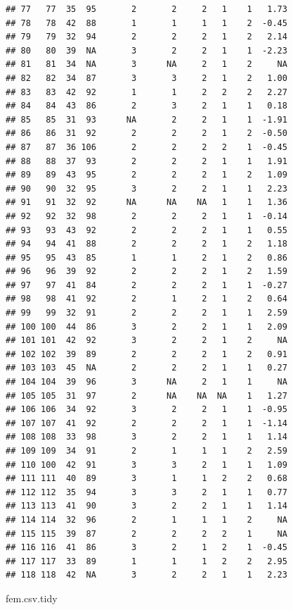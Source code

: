\documentclass[
]{book}
\newenvironment{Shaded}{\begin{snugshade}}{\end{snugshade}}
\newcommand{\NormalTok}[1]{#1}
\begin{document}
\begin{verbatim}
## 77   77  35  95       2       2     2   1    1   1.73
## 78   78  42  88       1       1     1   1    2  -0.45
## 79   79  32  94       2       2     2   1    2   2.14
## 80   80  39  NA       3       2     2   1    1  -2.23
## 81   81  34  NA       3      NA     2   1    2     NA
## 82   82  34  87       3       3     2   1    2   1.00
## 83   83  42  92       1       1     2   2    2   2.27
## 84   84  43  86       2       3     2   1    1   0.18
## 85   85  31  93      NA       2     2   1    1  -1.91
## 86   86  31  92       2       2     2   1    2  -0.50
## 87   87  36 106       2       2     2   2    1  -0.45
## 88   88  37  93       2       2     2   1    1   1.91
## 89   89  43  95       2       2     2   1    2   1.09
## 90   90  32  95       3       2     2   1    1   2.23
## 91   91  32  92      NA      NA    NA   1    1   1.36
## 92   92  32  98       2       2     2   1    1  -0.14
## 93   93  43  92       2       2     2   1    1   0.55
## 94   94  41  88       2       2     2   1    2   1.18
## 95   95  43  85       1       1     2   1    2   0.86
## 96   96  39  92       2       2     2   1    2   1.59
## 97   97  41  84       2       2     2   1    1  -0.27
## 98   98  41  92       2       1     2   1    2   0.64
## 99   99  32  91       2       2     2   1    1   2.59
## 100 100  44  86       3       2     2   1    1   2.09
## 101 101  42  92       3       2     2   1    2     NA
## 102 102  39  89       2       2     2   1    2   0.91
## 103 103  45  NA       2       2     2   1    1   0.27
## 104 104  39  96       3      NA     2   1    1     NA
## 105 105  31  97       2      NA    NA  NA    1   1.27
## 106 106  34  92       3       2     2   1    1  -0.95
## 107 107  41  92       2       2     2   1    1  -1.14
## 108 108  33  98       3       2     2   1    1   1.14
## 109 109  34  91       2       1     1   1    2   2.59
## 110 100  42  91       3       3     2   1    1   1.09
## 111 111  40  89       3       1     1   2    2   0.68
## 112 112  35  94       3       3     2   1    1   0.77
## 113 113  41  90       3       2     2   1    1   1.14
## 114 114  32  96       2       1     1   1    2     NA
## 115 115  39  87       2       2     2   2    1     NA
## 116 116  41  86       3       2     1   2    1  -0.45
## 117 117  33  89       1       1     1   2    2   2.95
## 118 118  42  NA       3       2     2   1    1   2.23
\end{verbatim}

\begin{Shaded}
\begin{Highlighting}[]
\NormalTok{fem.csv.tidy}
\end{Highlighting}
\end{Shaded}
\end{document}
